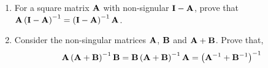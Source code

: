 \documentclass[9pt]{article}
\def\mf{\ensuremath\mathbf}
\def\lp{\ensuremath\left(}
\def\rp{\ensuremath\right)}
\begin{document}
\begin{multicols}{2}
\begin{enumerate}[resume]

    \item For a square matrix $\mf{A}$ with non-signular $\mf{I} - \mf{A}$, prove that $\mf{A}\lp\mf{I} - \mf{A}\rp^{-1} = \lp\mf{I} - \mf{A}\rp^{-1}\mf{A}$.

    \item Consider the non-singular matrices $\mf{A}$, $\mf{B}$ and $\mf{A} + \mf{B}$. Prove that,
    \[ \mf{A}\lp\mf{A} + \mf{B}\rp^{-1}\mf{B} = \mf{B}\lp\mf{A} + \mf{B}\rp^{-1}\mf{A} = \lp\mf{A}^{-1} + \mf{B}^{-1}\rp^{-1} \]

\end{enumerate}


\end{multicols}
\end{document}
